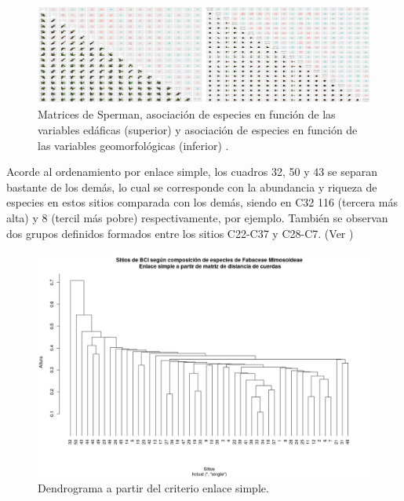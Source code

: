 \documentclass[11pt,]{article}
\begin{document}
\begin{figure}
\centering
\includegraphics[width=1.00000\textwidth]{Analisis/Imagenes manuscrito/Seperman_R.png}
\caption{Matrices de Sperman, asociación de especies en función de las
variables edáficas (superior) y asociación de especies en función de las
variables geomorfológicas (inferior) .\label{fig:sper}}
\end{figure}

Acorde al ordenamiento por enlace simple, los cuadros 32, 50 y 43 se
separan bastante de los demás, lo cual se corresponde con la abundancia
y riqueza de especies en estos sitios comparada con los demás, siendo en
C32 116 (tercera más alta) y 8 (tercil más pobre) respectivamente, por
ejemplo. También se observan dos grupos definidos formados entre los
sitios C22-C37 y C28-C7. (Ver \label{fig:denS})

\begin{figure}
\centering
\includegraphics[width=1.00000\textwidth]{DenSimple.png}
\caption{Dendrograma a partir del criterio enlace
simple.\label{fig:denS}}
\end{figure}
\end{document}
